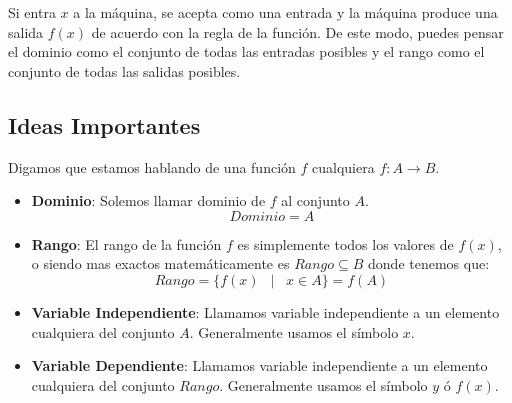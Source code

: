 \documentclass[12pt, fleqn]{report}                             %
\DeclareMathOperator \Space     {\quad}                         %
\DeclareMathOperator \MiniSpace {\;}                            %
\newcommand \Such           {\MiniSpace | \MiniSpace}           %
\theoremstyle{break}                                            %
\begin{document}
            Si entra $x$ a la máquina, se acepta como una entrada y la máquina produce una
            salida $f(x)$ de acuerdo con la regla de la función. De este modo, puedes pensar
            el dominio como el conjunto de todas las entradas posibles y el rango como el
            conjunto de todas las salidas posibles.

            \subsection{Ideas Importantes}

                Digamos que estamos hablando de una función $f$ cualquiera $f: A \to B$.


                \begin{itemize}
                    \item \textbf{Dominio}:
                        Solemos llamar dominio de $f$ al conjunto $A$.
                        \begin{equation}
                            Dominio = A
                        \end{equation}

                    \item \textbf{Rango}:
                        El rango de la función $f$ es simplemente todos los valores
                        de $f(x)$, o siendo mas exactos matemáticamente es $Rango \subseteq B$
                        donde tenemos que:
                        \begin{equation}
                            Rango = \{ f(x) \Such x \in A \} = f(A)
                        \end{equation}

                    \item \textbf{Variable Independiente}:
                        Llamamos variable independiente a un elemento cualquiera del conjunto $A$.
                        Generalmente usamos el símbolo $x$.

                    \item \textbf{Variable Dependiente}:
                        Llamamos variable independiente a un elemento cualquiera del conjunto $Rango$.
                        Generalmente usamos el símbolo $y$ ó $f(x)$.

                \end{itemize}
\end{document}

